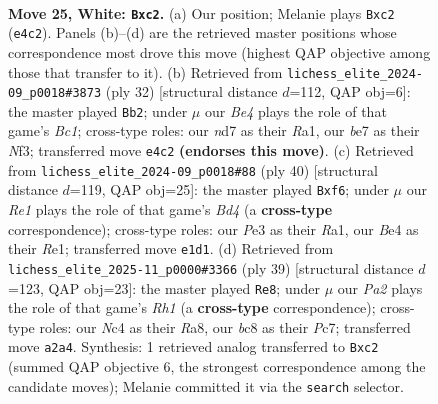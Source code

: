 \documentclass[11pt]{article}
\begin{document}
\clearpage

\begin{figure}[p]\centering
\begin{subfigure}{0.46\textwidth}\centering
\resizebox{\linewidth}{!}{%
\newchessgame
\chessboard[
  setfen={rnb5/1p1nb1k1/p3ppp1/7p/2N1B3/1P2P1P1/P1p1PK1P/R1BrR3 w - - 6 25},
  showmover=false,
  pgfstyle=straightmove, color=movearrow, markmove={e4-c2}
]}
\caption{}
\end{subfigure}\hfill
\begin{subfigure}{0.46\textwidth}\centering
\resizebox{\linewidth}{!}{%
\newchessgame
\chessboard[
  setfen={r2rb1k1/pp2npp1/2n1p2p/8/1PP5/P2B1N2/5PPP/R1BR2K1 w - - 1 17},
  showmover=false,
  pgfstyle=straightmove, color=movearrow, markmove={c1-b2}
]}
\caption{}
\end{subfigure}
\\[4pt]
\begin{subfigure}{0.46\textwidth}\centering
\resizebox{\linewidth}{!}{%
\newchessgame
\chessboard[
  setfen={4r1k1/p3ppbp/5np1/5b2/Nr1B4/5B2/PPP2PPP/R3R1K1 w - - 1 21},
  showmover=false,
  pgfstyle=straightmove, color=movearrow, markmove={d4-f6}
]}
\caption{}
\end{subfigure}\hfill
\begin{subfigure}{0.46\textwidth}\centering
\resizebox{\linewidth}{!}{%
\newchessgame
\chessboard[
  setfen={r1k4r/2p1bp2/1pb3p1/2p1Pn1p/P3N3/1PN2R2/1BP2PPP/3R2K1 b - - 0 20},
  showmover=false,
  pgfstyle=straightmove, color=movearrow, markmove={h8-e8}
]}
\caption{}
\end{subfigure}
\caption{\textbf{Move 25, White: \texttt{Bxc2}.} (a) Our position; Melanie plays \texttt{Bxc2} (\texttt{e4c2}). Panels (b)--(d) are the retrieved master positions whose correspondence most drove this move (highest QAP objective among those that transfer to it). (b) Retrieved from \texttt{lichess\_elite\_2024-09\_p0018\#3873} (ply 32) [structural distance $d$=112, QAP obj=6]: the master played \texttt{Bb2}; under $\mu$ our \emph{Be4} plays the role of that game's \emph{Bc1}; cross-type roles: our \emph{n}d7 as their \emph{R}a1, our \emph{b}e7 as their \emph{N}f3; transferred move \texttt{e4c2} \textbf{(endorses this move)}. (c) Retrieved from \texttt{lichess\_elite\_2024-09\_p0018\#88} (ply 40) [structural distance $d$=119, QAP obj=25]: the master played \texttt{Bxf6}; under $\mu$ our \emph{Re1} plays the role of that game's \emph{Bd4} (a \textbf{cross-type} correspondence); cross-type roles: our \emph{P}e3 as their \emph{R}a1, our \emph{B}e4 as their \emph{R}e1; transferred move \texttt{e1d1}. (d) Retrieved from \texttt{lichess\_elite\_2025-11\_p0000\#3366} (ply 39) [structural distance $d$=123, QAP obj=23]: the master played \texttt{Re8}; under $\mu$ our \emph{Pa2} plays the role of that game's \emph{Rh1} (a \textbf{cross-type} correspondence); cross-type roles: our \emph{N}c4 as their \emph{R}a8, our \emph{b}c8 as their \emph{P}c7; transferred move \texttt{a2a4}. Synthesis: 1 retrieved analog transferred to \texttt{Bxc2} (summed QAP objective 6, the strongest correspondence among the candidate moves); Melanie committed it via the \texttt{search} selector.}
\label{fig:thought-m48}
\end{figure}
\end{document}
